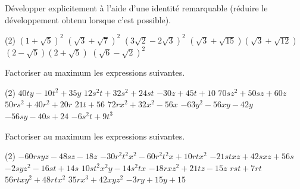 \documentclass[a4paper,12pt]{report}
\begin{document}
\begin{auto}
Développer explicitement à l'aide d'une identité remarquable
(réduire le développement obtenu lorsque c'est possible).
	\begin{tasks}(2)
\task $(1+\sqrt{5})^2$
\task $(\sqrt{3}+\sqrt{7})^2$
\task $(3 \sqrt{2}-2 \sqrt{3})^2$
\task $(\sqrt{3}+\sqrt{15})(\sqrt{3}+\sqrt{12})$
\task $(2-\sqrt{5})(2+\sqrt{5})$
\task $(\sqrt{6}-\sqrt{2})^2$
	\end{tasks}
\end{auto}


\begin{auto}Factoriser au maximum les expressions suivantes.

\begin{tasks}(2)
	\task $40 t y-10 t^2 + 35 y$
	\task $12 s^2 t + 32 s^2 + 24 s t$
	\task $-30 z + 45 t + 10 $
	\task $70 s z^2 + 50 s z + 60 z$
	\task $50 r s^2 + 40 r^2 + 20 r$
	\task $21 t + 56 $
	\task $72 r x^2 + 32 x^2-56 x$
	\task $-63 y^2-56 x y-42 y$
	\task $-56 s y-40 s + 24 $
	\task $-6 s^2 t + 9 t^3$
\end{tasks}
\end{auto}

\begin{auto}Factoriser au maximum les expressions suivantes.

\begin{tasks}(2)
	\task $-60 r s y z-48 s z-18 z$
	\task $-30 r^2 t^2 x^2-60 r^2 t^2 x + 10 r t x^2$
	\task $-21 s t x z + 42 s x z + 56 s$
	\task $-2 s y z^2-16 s t + 14 s$
	\task $10 s t^2 x^2 y-14 s^2 t x$
	\task $-18 r x z^2 + 21 t z-15 z$
	\task $r s t + 7 r t$
	\task $56 r t x y^2 + 48 r t x^2$
	\task $35 r x^3 + 42 x y z^2$
	\task $-3 r y + 15 y + 15 $
\end{tasks}
\end{auto}
\end{document}
